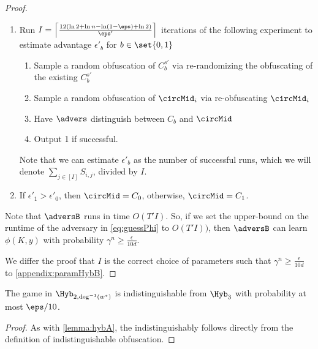 \begin{lemma}
\begin{proof}
		\begin{enumerate}
			\item Run $I =\left\lceil 
			\frac{12\left(\ln 2 + \ln n - \ln\left(1 - \eps\right) + \ln 2\right)}{\eps'} \right\rceil$ iterations of the following experiment to estimate advantage $\epsilon'_b$ for $b \in \set{0, 1}$
				\begin{enumerate}
					\item Sample a random obfuscation of $C_b^{s'}$ via re-randomizing the obfuscating of the existing $C_b^{s'}$
					\item Sample a random obfuscation of $\circMid_i$ via re-obfuscating $\circMid_i$
					\item Have $\advers$ distinguish between $C_b$ and $\circMid$
					\item Output 1 if successful.
				\end{enumerate}
			Note that we can estimate $\epsilon'_b$ as the number of successful runs, which we will denote $\sum_{j \in [I]} S_{i, j}$, divided by $I$.
			\item If $\epsilon'_1 > \epsilon'_0$, then $\circMid = C_0$, otherwise, $\circMid = C_1$.
		\end{enumerate}

		Note that $\adversB$ runs in time $O(T' I)$. So, if we set the upper-bound on the runtime of the adversary in \cref{eq:guessPhi}
		to $O(T' I))$, then $\adversB$ can learn $\phi(K, y)$ with probability $\gamma^n \geq \frac{\epsilon}{10d}$.

		We differ the proof that $I$ is the correct choice of parameters such that
		$\gamma^n \geq \frac{\epsilon}{10d}$ to \cref{appendix:paramHybB}.
	\end{proof}
	
\end{lemma}

\begin{lemma}
	The game in $\Hyb_{2, \deg^{-1}(w^*)}$ is indistinguishable from $\Hyb_3$ with probability
	at most $\eps/10$.
	\begin{proof}
		As with \cref{lemma:hybA}, 
		the indistinguishably follows directly from the definition of indistinguishable obfuscation.
	\end{proof}
\end{lemma}

